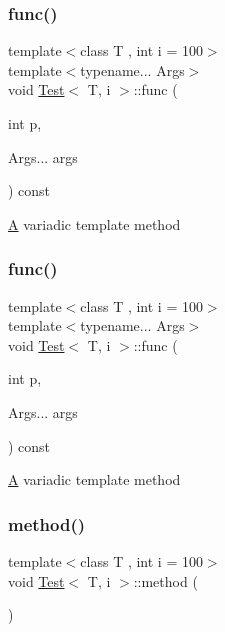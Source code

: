 \subsubsection{\texorpdfstring{func()}{func()}\hspace{0.1cm}{\footnotesize\ttfamily [1/2]}}
{\footnotesize\ttfamily template$<$class T , int i = 100$>$ \\
template$<$typename... Args$>$ \\
void \mbox{\hyperlink{class_test}{Test}}$<$ T, i $>$\+::func (\begin{DoxyParamCaption}\item[{int}]{p,  }\item[{Args...}]{args }\end{DoxyParamCaption}) const}

\mbox{\hyperlink{class_a}{A}} variadic template method \mbox{\label{class_test_a9c530a92e47e916f87c6eed72057d10a}} 
\subsubsection{\texorpdfstring{func()}{func()}\hspace{0.1cm}{\footnotesize\ttfamily [2/2]}}
{\footnotesize\ttfamily template$<$class T , int i = 100$>$ \\
template$<$typename... Args$>$ \\
void \mbox{\hyperlink{class_test}{Test}}$<$ T, i $>$\+::func (\begin{DoxyParamCaption}\item[{int}]{p,  }\item[{Args...}]{args }\end{DoxyParamCaption}) const}

\mbox{\hyperlink{class_a}{A}} variadic template method \mbox{\label{class_test_a2a91524f180391310e4e2735599b3f18}} 
\subsubsection{\texorpdfstring{method()}{method()}}
{\footnotesize\ttfamily template$<$class T , int i = 100$>$ \\
void \mbox{\hyperlink{class_test}{Test}}$<$ T, i $>$\+::method (\begin{DoxyParamCaption}{ }\end{DoxyParamCaption})}

